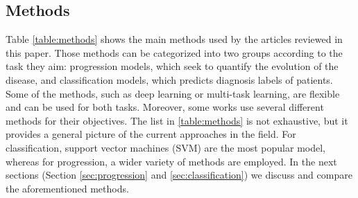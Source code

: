\subsection{Methods}

Table \ref{table:methods} shows the main methods used by the articles reviewed in this paper. Those methods can be  categorized into two groups according to the task they aim: progression models, which seek to quantify the evolution of the disease, and classification models, which predicts diagnosis labels of patients. Some of the methods, such as deep learning or multi-task learning, are flexible and can be used for both tasks. Moreover, some works use several different methods for their objectives. The list in \ref{table:methods} is not exhaustive, but it provides a general picture of the current approaches in the field. For classification, support vector machines (SVM) are the most popular model, whereas for progression, a wider variety of methods are employed. In the next sections (Section \ref{sec:progression} and \ref{sec:classification}) we discuss and compare the aforementioned methods. 

